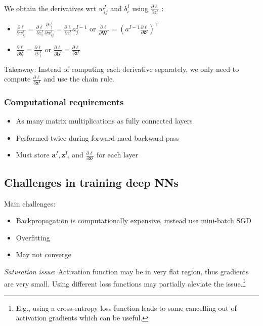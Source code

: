 \documentclass[11pt, %
	oneside, %
	english, %
	onehalfspacing, %
	parskip, %
	]{article} %
\theoremstyle{definition}
\begin{document}
We obtain the derivatives wrt $w_{i j}^{I}$ and $b_i^{I}$ using $\frac{\partial \ell}{\partial z^{I}}$ :
\begin{itemize}
	\item $\frac{\partial \ell}{\partial w_{i j}^I}=\frac{\partial \ell}{\partial z_i^{I}} \frac{\partial z_j^I}{\partial w_{i j}^I}=\frac{\partial \ell}{\partial z_i^I} a_j^{I-1}$ or $\frac{\partial \ell}{\partial \mathbf{W}^{I}}=\left(a^{I-1} \frac{\partial \ell}{\partial \mathbf{z}^{I}}\right)^{\top}$
	\item $\frac{\partial \ell}{\partial b_i^{I}}=\frac{\partial \ell}{\partial z_i^{I}}$ or $\frac{\partial \ell}{\partial \mathbf{b}^{I}}=\frac{\partial \ell}{\partial \mathbf{z}^{I}}$
\end{itemize}

Takeaway: Instead of computing each derivative separately, we only need to compute $\frac{\partial \ell}{\partial \mathbf{z}^{I}}$ and use the chain rule.

\subsubsection*{Computational requirements}

\begin{itemize}
	\item As many matrix multiplications as fully connected layers
	\item Performed twice during forward nacd backward pass
	\item Must store $\mathbf{a}^{I}, \mathbf{z}^{I} \text {, and } \frac{\partial \ell}{\partial \mathbf{z}^{I}}$ for each layer
\end{itemize}


\subsection{Challenges in training deep NNs}

Main challenges:
\begin{itemize}
	\item Backpropagation is computationally expensive, instead use mini-batch SGD
	\item Overfitting
	\item May not converge
\end{itemize}


\emph{Saturation issue}: Activation function may be in very flat region, thus gradients are very small. Using different loss functions may partially aleviate the issue.\footnote{E.g., using a cross-entropy loss function leads to some cancelling out of activation gradients which can be useful.}
\end{document}
